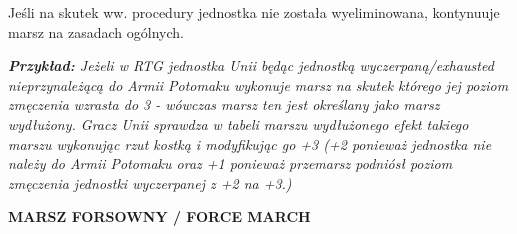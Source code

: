 Jeśli na skutek ww. procedury jednostka nie została wyeliminowana, kontynuuje marsz na zasadach ogólnych.\par
\textit{\textbf{Przykład:} Jeżeli w RTG jednostka Unii będąc jednostką wyczerpaną/exhausted nieprzynależącą do Armii Potomaku wykonuje marsz na skutek którego jej poziom zmęczenia wzrasta do 3 - wówczas marsz ten jest określany jako marsz wydłużony. Gracz Unii sprawdza w tabeli marszu wydłużonego efekt takiego marszu wykonując rzut kostką i modyfikując go +3 (+2 ponieważ jednostka nie należy do Armii Potomaku oraz +1 ponieważ przemarsz podniósł poziom zmęczenia jednostki wyczerpanej z +2 na +3.)}
	
\bigbreak
\textbf{MARSZ FORSOWNY / FORCE MARCH}
\bigbreak